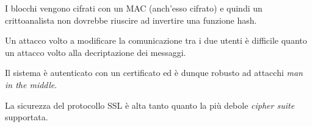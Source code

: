 I blocchi vengono cifrati con un MAC (anch'esso cifrato) e quindi un crittoanalista non dovrebbe riuscire ad invertire
una funzione hash.

Un attacco volto a modificare la comunicazione tra i due utenti \`e difficile quanto un attacco volto alla decriptazione
dei messaggi.

Il sistema \`e autenticato con un certificato ed \`e dunque robusto ad attacchi \emph{man in the middle}.

La sicurezza del protocollo SSL \`e alta tanto quanto la pi\`u debole \emph{cipher suite} supportata.